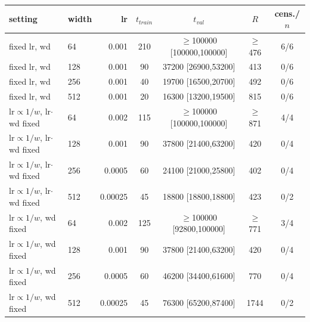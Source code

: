 \begin{tabular}{llrcccc}
\toprule
setting & width & lr & $t_{train}$ & $t_{val}$ & $R$ & cens./$n$ \\
\midrule
fixed lr, wd & 64 & 0.001 & 210 & $\geq$100000 [100000,100000] & $\geq$476 & 6/6 \\
fixed lr, wd & 128 & 0.001 & 90 & 37200 [26900,53200] & 413 & 0/6 \\
fixed lr, wd & 256 & 0.001 & 40 & 19700 [16500,20700] & 492 & 0/6 \\
fixed lr, wd & 512 & 0.001 & 20 & 16300 [13200,19500] & 815 & 0/6 \\
lr$\propto1/w$, lr$\cdot$wd fixed & 64 & 0.002 & 115 & $\geq$100000 [100000,100000] & $\geq$871 & 4/4 \\
lr$\propto1/w$, lr$\cdot$wd fixed & 128 & 0.001 & 90 & 37800 [21400,63200] & 420 & 0/4 \\
lr$\propto1/w$, lr$\cdot$wd fixed & 256 & 0.0005 & 60 & 24100 [21000,25800] & 402 & 0/4 \\
lr$\propto1/w$, lr$\cdot$wd fixed & 512 & 0.00025 & 45 & 18800 [18800,18800] & 423 & 0/2 \\
lr$\propto1/w$, wd fixed & 64 & 0.002 & 125 & $\geq$100000 [92800,100000] & $\geq$771 & 3/4 \\
lr$\propto1/w$, wd fixed & 128 & 0.001 & 90 & 37800 [21400,63200] & 420 & 0/4 \\
lr$\propto1/w$, wd fixed & 256 & 0.0005 & 60 & 46200 [34400,61600] & 770 & 0/4 \\
lr$\propto1/w$, wd fixed & 512 & 0.00025 & 45 & 76300 [65200,87400] & 1744 & 0/2 \\
\bottomrule
\end{tabular}